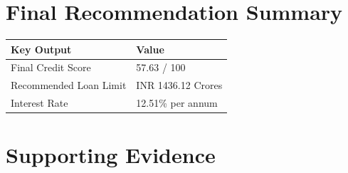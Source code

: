 \documentclass[11pt,a4paper]{article}
\begin{document}
\section*{Final Recommendation Summary}
\begin{longtable}{p{3.2cm} p{1.8cm}}
\toprule
Key Output & Value \\
\midrule
\endhead
Final Credit Score & 57.63 / 100 \\
Recommended Loan Limit & INR 1436.12 Crores \\
Interest Rate & 12.51\% per annum \\
\bottomrule
\end{longtable}

\section*{Supporting Evidence}
\end{document}
